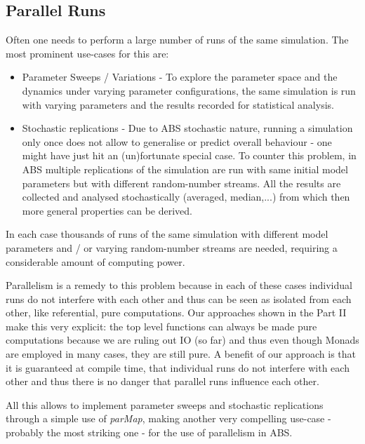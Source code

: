 \subsection{Parallel Runs}
Often one needs to perform a large number of runs of the same simulation. The most prominent use-cases for this are:

\begin{itemize}
	\item Parameter Sweeps / Variations - To explore the parameter space and the dynamics under varying parameter configurations, the same simulation is run with varying parameters and the results recorded for statistical analysis.
	
	\item Stochastic replications - Due to ABS stochastic nature, running a simulation only once does not allow to generalise or predict overall behaviour - one might have just hit an (un)fortunate special case. To counter this problem, in ABS multiple replications of the  simulation are run with same initial model parameters but with different random-number streams. All the results are collected and analysed stochastically (averaged, median,...) from which then more general properties can be derived.
\end{itemize}

In each case thousands of runs of the same simulation with different model parameters and / or varying random-number streams are needed, requiring a considerable amount of computing power.

Parallelism is a remedy to this problem because in each of these cases individual runs do not interfere with each other and thus can be seen as isolated from each other, like referential, pure computations. Our approaches shown in the Part II make this very explicit: the top level functions can always be made pure computations because we are ruling out IO (so far) and thus even though Monads are employed in many cases, they are still pure. A benefit of our approach is that it is guaranteed at compile time, that individual runs do not interfere with each other and thus there is no danger that parallel runs influence each other. 

All this allows to implement parameter sweeps and stochastic replications through a simple use of \textit{parMap}, making another very compelling use-case - probably the most striking one - for the use of parallelism in ABS.